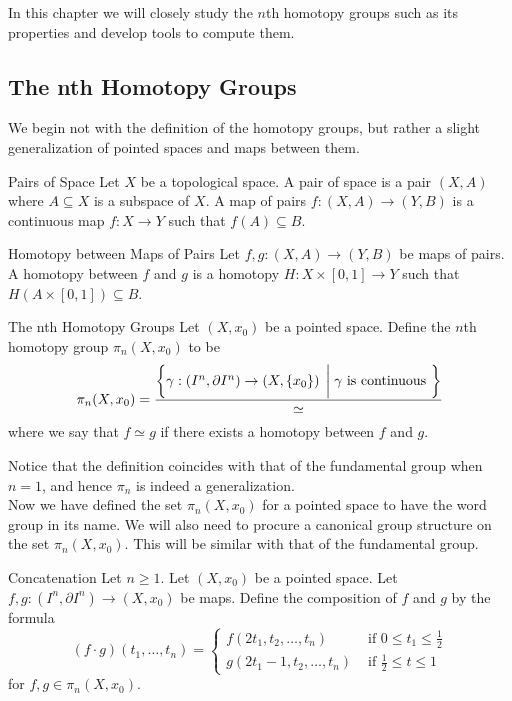 \documentclass[a4paper]{article}
\begin{document}
In this chapter we will closely study the $n$th homotopy groups such as its properties and develop tools to compute them. 

\subsection{The nth Homotopy Groups}
We begin not with the definition of the homotopy groups, but rather a slight generalization of pointed spaces and maps between them. 

\begin{defn}{Pairs of Space}{} Let $X$ be a topological space. A pair of space is a pair $(X,A)$ where $A\subseteq X$ is a subspace of $X$. A map of pairs $f:(X,A)\to(Y,B)$ is a continuous map $f:X\to Y$ such that $f(A)\subseteq B$. 
\end{defn}

\begin{defn}{Homotopy between Maps of Pairs}{} Let $f,g:(X,A)\to (Y,B)$ be maps of pairs. A homotopy between $f$ and $g$ is a homotopy $H:X\times[0,1]\to Y$ such that $H(A\times[0,1])\subseteq B$. 
\end{defn}

\begin{defn}{The nth Homotopy Groups}{} Let $(X,x_0)$ be a pointed space. Define the $n$th homotopy group $\pi_n(X,x_0)$ to be $$\pi_n(X,x_0)=\frac{\left\{\gamma:\left(I^n,\partial I^n\right)\to\left(X,\{x_0\}\right)\;\bigg{|}\;\gamma\text{ is continuous }\right\}}{\simeq}$$ where we say that $f\simeq g$ if there exists a homotopy between $f$ and $g$. 
\end{defn}

Notice that the definition coincides with that of the fundamental group when $n=1$, and hence $\pi_n$ is indeed a generalization. \\

Now we have defined the set $\pi_n(X,x_0)$ for a pointed space to have the word group in its name. We will also need to procure a canonical group structure on the set $\pi_n(X,x_0)$. This will be similar with that of the fundamental group. 

\begin{defn}{Concatenation}{} Let $n\geq 1$. Let $(X,x_0)$ be a pointed space. Let $f,g:(I^n,\partial I^n)\to(X,x_0)$ be maps. Define the composition of $f$ and $g$ by the formula $$(f\cdot g)(t_1,\dots,t_n)=\begin{cases}
f(2t_1,t_2,\dots,t_n) & \text{ if } 0\leq t_1\leq\frac{1}{2}\\
g(2t_1-1,t_2,\dots,t_n) & \text{ if } \frac{1}{2}\leq t\leq 1
\end{cases}$$ for $f,g\in\pi_n(X,x_0)$. 
\end{defn}
\end{document}

